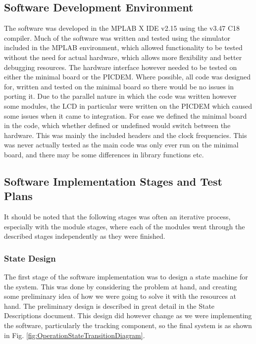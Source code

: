 \documentclass[]{report}
\begin{document}
\subsection{Software Development Environment}
The software was developed in the MPLAB X IDE v2.15 using the v3.47 C18 compiler. Much of the software was written and tested using the simulator included in the MPLAB environment, which allowed functionality to be tested without the need for actual hardware, which allows more flexibility and better debugging resources. The hardware interface however needed to be tested on either the minimal board or the PICDEM. Where possible, all code was designed for, written and tested on the minimal board so there would be no issues in porting it. Due to the parallel nature in which the code was written however some modules, the LCD in particular were written on the PICDEM which caused some issues when it came to integration. \newline
For ease we defined the minimal board in the code, which whether defined or undefined would switch between the hardware. This was mainly the included headers and the clock frequencies. This was never actually tested as the main code was only ever run on the minimal board, and there may be some differences in library functions etc.

\subsection{Software Implementation Stages and Test Plans}
It should be noted that the following stages was often an iterative process, especially with the module stages, where each of the modules went through the described stages independently as they were finished.

\subsubsection{State Design}
The first stage of the software implementation was to design a state machine for the system. This was done by considering the problem at hand, and creating some preliminary idea of how we were going to solve it with the resources at hand. \newline
The preliminary design is described in great detail in the State Descriptions document. This design did however change as we were implementing the software, particularly the tracking component, so the final system is as shown in Fig. \ref{fig:OperationStateTransitionDiagram}.
\end{document}
